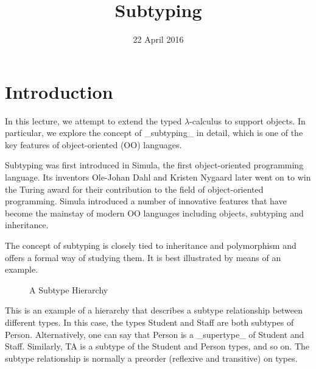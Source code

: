 \title{Subtyping}
\date{22 April 2016}
\maketitle

\section{Introduction}

In this lecture, we attempt to extend the typed $\lambda$-calculus to
support objects. In particular, we explore the concept of _subtyping_
in detail, which is one of the key features of object-oriented (OO)
languages.

Subtyping was first introduced in Simula, the first object-oriented
programming language. Its inventors Ole-Johan Dahl and Kristen Nygaard
later went on to win the Turing award for their contribution to the
field of object-oriented programming. Simula introduced a number of
innovative features that have become the mainstay of modern OO
languages including objects, subtyping and inheritance.

The concept of subtyping is closely tied to inheritance and
polymorphism and offers a formal way of studying them. It is best
illustrated by means of an example.
\begin{figure}[h]
\begin{center}
\end{center}
\caption{A Subtype Hierarchy}
\end{figure}
This is an example of a hierarchy that describes a subtype
relationship between different types. In this case, the types Student
and Staff are both subtypes of Person. Alternatively, one can say that
Person is a _supertype_ of Student and Staff. Similarly, TA is a
subtype of the Student and Person types, and so on. The subtype
relationship is normally a preorder (reflexive and transitive) on
types.

